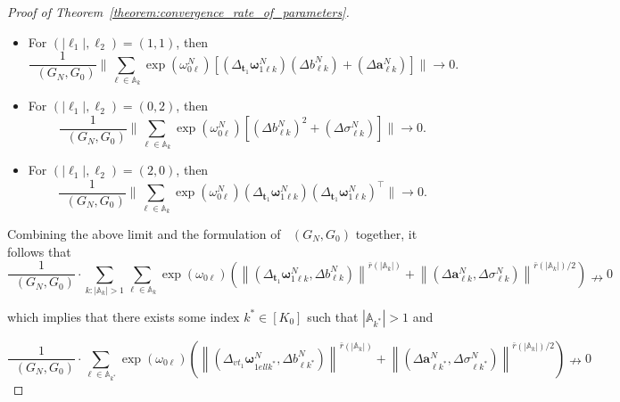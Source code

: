 \documentclass[twoside]{article}
\DeclareMathOperator*{\VD}{D_{V}}
\DeclareMathOperator*{\VDFRA}{D_{FRA}}
\theoremstyle{plain}
\theoremstyle{definition}
\theoremstyle{plain}
\def\vomega{{\bm{\omega}}}
\def\vell{{\bm{\ell}}}
\def\va{{\bm{a}}}
\def\vt{{\bm{t}}}
\def\sA{{\mathbb{A}}}
\newcommand{\norm}[1]{\|#1\|}
\begin{document}
\begin{proof}[Proof of Theorem~\ref{theorem:convergence_rate_of_parameters}]
\begin{itemize}
    \item For $(|\vell_1|, \ell_2) = (1, 1)$, then 
    \begin{equation}
        \frac{1}{\VD (G_N, G_0)} \norm{\sum_{\ell \in \sA_k} \exp{(\omega_{0\ell}^N)}[(\Delta_{\vt_1} \vomega_{1\ell k}^N)(\Delta b_{\ell k}^N) + (\Delta \va_{\ell k}^N)]} \to 0.\nonumber
    \end{equation}

    \item For $(|\vell_1|, \ell_2) = (0, 2)$, then 
    \begin{equation}
        \frac{1}{\VD (G_N, G_0)} \norm{\sum_{\ell \in \sA_k} \exp{(\omega_{0\ell}^N)}[(\Delta b_{\ell k}^N)^2 + (\Delta \sigma_{\ell k}^N)]} \to 0.\nonumber
    \end{equation}

    \item For $(|\vell_1|, \ell_2) = (2, 0)$, then 
    \begin{equation}
        \frac{1}{\VD (G_N, G_0)} \norm{\sum_{\ell \in \sA_k} \exp{(\omega_{0\ell}^N)}(\Delta_{\vt_1} \vomega_{1\ell k}^N)(\Delta_{\vt_1} \vomega_{1\ell k}^N)^{\top}} \to 0.\nonumber
    \end{equation}
\end{itemize}

Combining the above limit and the formulation of $\VDFRA (G_N, G_0)$ together, it follows that
\[
\frac{1}{\VD (G_N, G_0)} \cdot \sum_{k:\left|\sA_k\right|>1} \sum_{\ell \in \sA_k} \exp \left(\omega_{0 \ell}\right)\left(\left\|\left(\Delta_{\vt_{1}} \vomega_{1 \ell k}^{N}, \Delta b_{\ell k}^{N}\right)\right\|^{\bar{r}\left(\left|\sA_k\right|\right)}+\left\|\left(\Delta \va_{\ell k}^{N}, \Delta \sigma_{\ell k}^{N}\right)\right\|^{\bar{r}\left(\left|\sA_k\right|\right) / 2}\right) \nrightarrow 0
\]

which implies that there exists some index $k^{*} \in\left[K_0\right]$ such that $\left|\sA_{k^*}\right|>1$ and

\[
\frac{1}{\VD (G_N, G_0)} \cdot \sum_{\ell \in \sA_{k^*}}\exp \left(\omega_{0 \ell}\right)\left(\left\|\left(\Delta_{vt_{1}} \vomega_{1 ell k^{*}}^{N}, \Delta b_{\ell k^{*}}^{N}\right)\right\|^{\bar{r}\left(\left|\sA_k\right|\right)}+\left\|\left(\Delta \va_{\ell k^{*}}^{N}, \Delta \sigma_{\ell k^{*}}^{N}\right)\right\|^{\bar{r}\left(\left|\sA_k\right|\right) / 2}\right) \nrightarrow 0
\]


\end{proof}
\end{document}
